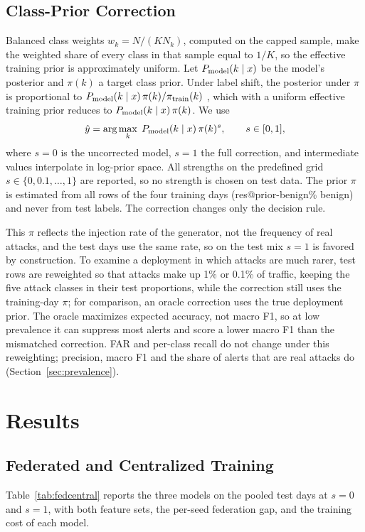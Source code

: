 \documentclass[conference]{IEEEtran}
\makeatletter
\providecommand{\R}[1]{\csname res@#1\endcsname}
\makeatother
\begin{document}
\subsection{Class-Prior Correction}\label{sec:prior}
Balanced class weights $w_k=N/(KN_k)$, computed on the capped sample, make the weighted share of every class in that sample equal to $1/K$, so the effective training prior is approximately uniform. Let $P_{\rm model}(k\mid x)$ be the model's posterior and $\pi(k)$ a target class prior. Under label shift, the posterior under $\pi$ is proportional to $P_{\rm model}(k\mid x)\,\pi(k)/\pi_{\rm train}(k)$ \cite{saerens2002}, which with a uniform effective training prior reduces to $P_{\rm model}(k\mid x)\,\pi(k)$. We use
\begin{equation}\hat y=\arg\max_k\; P_{\rm model}(k\mid x)\,\pi(k)^{s},\qquad s\in[0,1],\end{equation}
where $s=0$ is the uncorrected model, $s=1$ the full correction, and intermediate values interpolate in log-prior space. All strengths on the predefined grid $s\in\{0,0.1,\dots,1\}$ are reported, so no strength is chosen on test data. The prior $\pi$ is estimated from all rows of the four training days (\R{prior-benign}\% benign) and never from test labels. The correction changes only the decision rule.

This $\pi$ reflects the injection rate of the generator, not the frequency of real attacks, and the test days use the same rate, so on the test mix $s=1$ is favored by construction. To examine a deployment in which attacks are much rarer, test rows are reweighted so that attacks make up 1\% or 0.1\% of traffic, keeping the five attack classes in their test proportions, while the correction still uses the training-day $\pi$; for comparison, an oracle correction uses the true deployment prior. The oracle maximizes expected accuracy, not macro F1, so at low prevalence it can suppress most alerts and score a lower macro F1 than the mismatched correction. FAR and per-class recall do not change under this reweighting; precision, macro F1 and the share of alerts that are real attacks do (Section~\ref{sec:prevalence}).

\section{Results}\label{sec:results}

\subsection{Federated and Centralized Training}
Table~\ref{tab:fedcentral} reports the three models on the pooled test days at $s=0$ and $s=1$, with both feature sets, the per-seed federation gap, and the training cost of each model.
\end{document}
